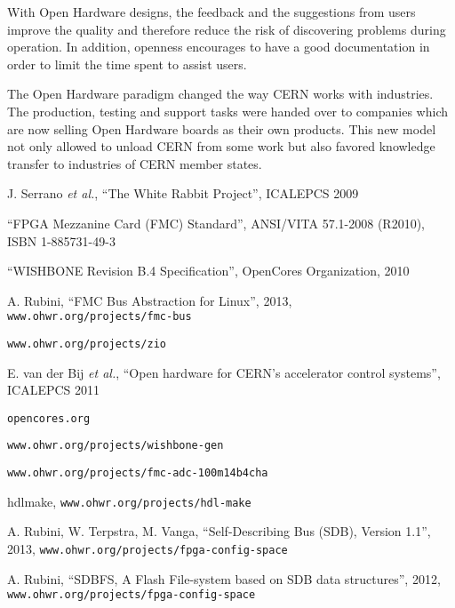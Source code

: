 \documentclass{JAC2003}
\begin{document}
With Open Hardware designs, the feedback and the suggestions from users improve the quality and therefore reduce the risk of discovering problems during operation.
In addition, openness encourages to have a good documentation in order to limit the time spent to assist users.

The Open Hardware paradigm changed the way CERN works with industries. The production, testing and support tasks were handed over to companies which are now selling Open Hardware boards as their own products.
This new model not only allowed to unload CERN from some work but also favored knowledge transfer to industries of CERN member states.





\begin{thebibliography}{99} %

J. Serrano \textit{et al.}, ``The White Rabbit Project'', ICALEPCS 2009

``FPGA Mezzanine Card (FMC) Standard'', ANSI/VITA 57.1-2008 (R2010), ISBN 1-885731-49-3

``WISHBONE Revision B.4 Specification'', OpenCores Organization, 2010

A. Rubini, ``FMC Bus Abstraction for Linux'', 2013, \texttt{www.ohwr.org/projects/fmc-bus}

\texttt{www.ohwr.org/projects/zio}

E. van der Bij \textit{et al.}, ``Open hardware for CERN's accelerator control systems'', ICALEPCS 2011

\texttt{opencores.org}


\texttt{www.ohwr.org/projects/wishbone-gen}

\texttt{www.ohwr.org/projects/fmc-adc-100m14b4cha}

hdlmake, \texttt{www.ohwr.org/projects/hdl-make}

A. Rubini, W. Terpstra, M. Vanga, ``Self-Describing Bus (SDB), Version 1.1'', 2013, \texttt{www.ohwr.org/projects/fpga-config-space}

A. Rubini, ``SDBFS, A Flash File-system based on SDB data structures'', 2012, \texttt{www.ohwr.org/projects/fpga-config-space}

\end{thebibliography}
\end{document}
